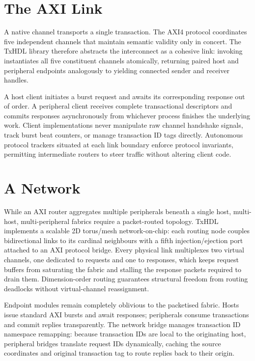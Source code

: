 \documentclass[journal,9pt]{IEEEtran}
\begin{document}
\section{The AXI Link}

A native channel transports a single transaction. The AXI4 protocol
coordinates five independent channels that maintain semantic validity only in
concert. The TxHDL library therefore abstracts the interconnect as a cohesive
link: invoking  instantiates all five constituent channels
atomically, returning paired host and peripheral endpoints analogously to
 yielding connected sender and receiver handles.

A host client initiates a burst request and awaits its corresponding response
out of order. A peripheral client receives complete transactional descriptors
and commits responses asynchronously from whichever process finishes the
underlying work. Client implementations never manipulate raw channel handshake
signals, track burst beat counters, or manage transaction ID tags directly.
Autonomous protocol trackers situated at each link boundary enforce protocol
invariants, permitting intermediate routers to steer traffic without altering
client code.

\section{A Network}

While an AXI router aggregates multiple peripherals beneath a single host,
multi-host, multi-peripheral fabrics require a packet-routed topology. TxHDL
implements a scalable 2D torus/mesh network-on-chip: each routing node couples
bidirectional links to its cardinal neighbours with a fifth injection/ejection
port attached to an AXI protocol bridge. Every physical link multiplexes two
virtual channels, one dedicated to requests and one to responses, which keeps
request buffers from saturating the fabric and stalling the response packets
required to drain them. Dimension-order routing guarantees structural freedom
from routing deadlocks without virtual-channel reassignment.

Endpoint modules remain completely oblivious to the packetised fabric. Hosts
issue standard AXI bursts and await responses; peripherals consume transactions
and commit replies transparently. The network bridge manages transaction ID
namespace remapping: because transaction IDs are local to the originating host,
peripheral bridges translate request IDs dynamically, caching the source
coordinates and original transaction tag to route replies back to their origin.
\end{document}
